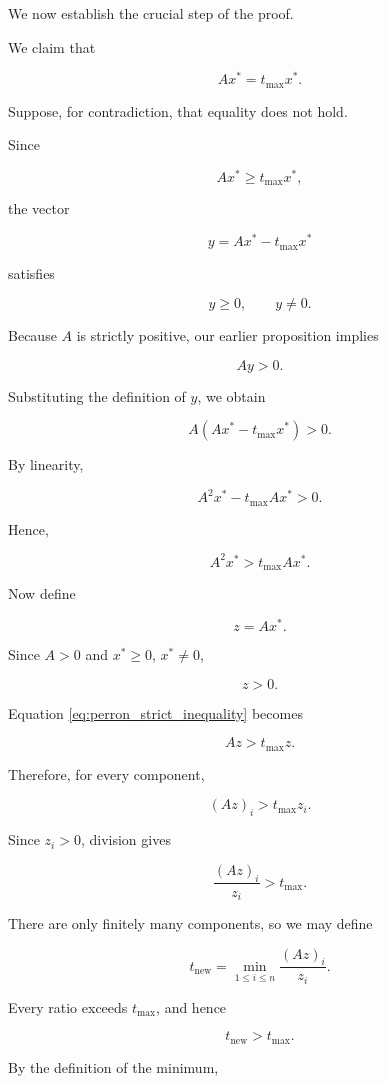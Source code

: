 \documentclass[11pt,a4paper]{article}
\theoremstyle{definition}
\theoremstyle{remark}
\begin{document}
We now establish the crucial
step of the proof.

We claim that

\begin{equation}
Ax^*=t_{\max}x^*.
\label{eq:perron_eigenvalue_equation}
\end{equation}

Suppose, for contradiction,
that equality does not hold.

Since

\[
Ax^*\geq t_{\max}x^*,
\]

the vector

\[
y=Ax^*-t_{\max}x^*
\]

satisfies

\[
y\geq0,
\qquad
y\neq0.
\]

Because $A$ is strictly positive,
our earlier proposition implies

\[
Ay>0.
\]

Substituting the definition
of $y$, we obtain

\[
A(Ax^*-t_{\max}x^*)>0.
\]

By linearity,

\[
A^2x^*-t_{\max}Ax^*>0.
\]

Hence,

\begin{equation}
A^2x^*>t_{\max}Ax^*.
\label{eq:perron_strict_inequality}
\end{equation}

Now define

\[
z=Ax^*.
\]

Since $A>0$ and
$x^*\geq0$, $x^*\neq0$,

\[
z>0.
\]

Equation
\eqref{eq:perron_strict_inequality}
becomes

\[
Az>t_{\max}z.
\]

Therefore, for every component,

\[
(Az)_i>t_{\max}z_i.
\]

Since $z_i>0$, division gives

\[
\frac{(Az)_i}{z_i}>t_{\max}.
\]

There are only finitely many
components, so we may define

\[
t_{\mathrm{new}}
=
\min_{1\leq i\leq n}
\frac{(Az)_i}{z_i}.
\]

Every ratio exceeds
$t_{\max}$, and hence

\[
t_{\mathrm{new}}>t_{\max}.
\]

By the definition of the minimum,
\end{document}
